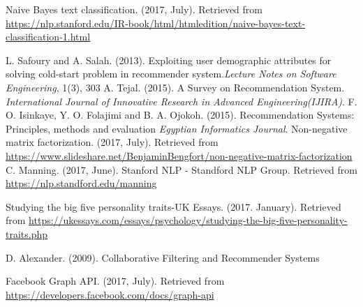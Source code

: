 \documentclass[journal]{IEEEtran}
\begin{document}
\begin{thebibliography}{1}
Naive Bayes text classification. (2017, July). Retrieved from \url{https://nlp.stanford.edu/IR-book/html/htmledition/naive-bayes-text-classification-1.html}

L. Safoury and A. Salah. (2013). Exploiting user demographic attributes for solving cold-start problem in recommender system.\textit{Lecture Notes on Software Engineering}, 1(3), 303
A. Tejal. (2015). A Survey on Recommendation System. \textit{International Journal of Innovative Research in Advanced Engineering(IJIRA)}.
F. O. Isinkaye, Y. O. Folajimi and B. A. Ojokoh. (2015). Recommendation Systems: Principles, methods and evaluation \textit{Egyptian Informatics Journal}.
Non-negative matrix factorization. (2017, July). Retrieved from \url{https://www.slideshare.net/BenjaminBengfort/non-negative-matrix-factorization}
C. Manning. (2017, June). Stanford NLP - Standford NLP Group. Retrieved from \url{https://nlp.standford.edu/manning}

Studying the big five personality traits-UK Essays. (2017. January). Retrieved from \url{https://ukessays.com/essays/psychology/studying-the-big-five-personality-traits.php}

D. Alexander. (2009). Collaborative Filtering and Recommender Systems

Facebook Graph API. (2017, July). Retrieved from \url{https://developers.facebook.com/docs/graph-api}

\end{thebibliography}

% 








\end{document}
